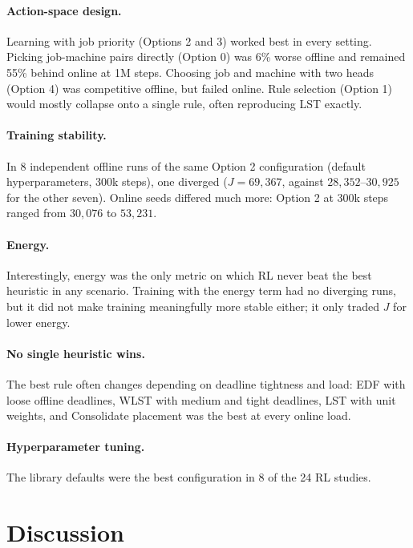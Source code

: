 \documentclass[12pt]{article}
\begin{document}
\paragraph{Action-space design.} Learning with job priority (Options 2 and 3) worked best in every setting. Picking job-machine pairs directly (Option 0) was 6\% worse offline and remained 55\% behind online at 1M steps. Choosing job and machine with two heads (Option 4) was competitive offline, but failed online. Rule selection (Option 1) would mostly collapse onto a single rule, often reproducing LST exactly.

\paragraph{Training stability.} In 8 independent offline runs of the same Option 2 configuration (default hyperparameters, 300k steps), one diverged ($J = 69{,}367$, against $28{,}352$--$30{,}925$ for the other seven). Online seeds differed much more: Option 2 at 300k steps ranged from $30{,}076$ to $53{,}231$.

\paragraph{Energy.} Interestingly, energy was the only metric on which RL never beat the best heuristic in any scenario. Training with the energy term had no diverging runs, but it did not make training meaningfully more stable either; it only traded $J$ for lower energy.

\paragraph{No single heuristic wins.} The best rule often changes depending on deadline tightness and load: EDF with loose offline deadlines, WLST with medium and tight deadlines, LST with unit weights, and Consolidate placement was the best at every online load.

\paragraph{Hyperparameter tuning.} The library defaults were the best configuration in 8 of the 24 RL studies.

\section{Discussion}\label{sec:discussion}
\end{document}
